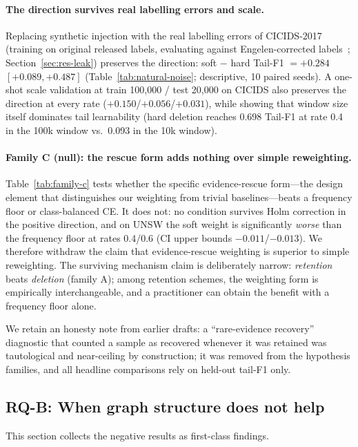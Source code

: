 \documentclass[pdflatex,referee,lineno,sn-basic,Numbered]{sn-jnl}
\begin{document}


\paragraph{The direction survives real labelling errors and scale.}
Replacing synthetic injection with the real labelling errors of CICIDS-2017
(training on original released labels, evaluating against Engelen-corrected
labels~\cite{liu2022error}; Section~\ref{sec:res-leak}) preserves the
direction: soft $-$ hard Tail-F1 $=+0.284$ $[+0.089, +0.487]$
(Table~\ref{tab:natural-noise}; descriptive, 10 paired seeds). A one-shot
scale validation at train 100{,}000 / test 20{,}000 on CICIDS also preserves
the direction at every rate ($+0.150$/$+0.056$/$+0.031$), while showing that
window size itself dominates tail learnability (hard deletion reaches 0.698
Tail-F1 at rate 0.4 in the 100k window vs.\ 0.093 in the 10k window).



\paragraph{Family C (null): the rescue form adds nothing over simple reweighting.}
Table~\ref{tab:family-c} tests whether the specific evidence-rescue form---the
design element that distinguishes our weighting from trivial baselines---beats
a frequency floor or class-balanced CE. It does not: no condition survives
Holm correction in the positive direction, and on UNSW the soft weight is
significantly \emph{worse} than the frequency floor at rates 0.4/0.6 (CI upper
bounds $-0.011$/$-0.013$). We therefore withdraw the claim that evidence-rescue
weighting is superior to simple reweighting. The surviving mechanism claim is
deliberately narrow: \emph{retention} beats \emph{deletion} (family A); among
retention schemes, the weighting form is empirically interchangeable, and a
practitioner can obtain the benefit with a frequency floor alone.



We retain an honesty note from earlier drafts: a ``rare-evidence recovery''
diagnostic that counted a sample as recovered whenever it was retained was
tautological and near-ceiling by construction; it was removed from the
hypothesis families, and all headline comparisons rely on held-out tail-F1
only.

\subsection{RQ-B: When graph structure does not help}
\label{sec:res-nohelp}
This section collects the negative results as first-class findings.
\end{document}
